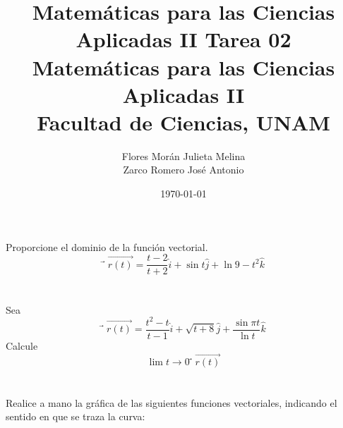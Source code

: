 \documentclass[12pt]{article}
\title{Matemáticas para las Ciencias Aplicadas II}
\title{
	\textbf{Tarea 02} \\
	\vspace{1ex}
	\large Matemáticas para las Ciencias Aplicadas II \\
	Facultad de Ciencias, UNAM}
\date{\today}
\author{Flores Morán Julieta Melina \\ Zarco Romero José Antonio}
\begin{document}
\maketitle

\section{}

Proporcione el dominio de la función vectorial.
$$
⃗\vec{r(t)}
=
\frac{t-2}{t+2}\hat{i}
+
\sin{t}\hat{j}
+
\ln{9-t^2}\hat{k}
$$

\section{}

Sea
$$
⃗\vec{r(t)}
=
\frac{t^2-t}{t-1}\hat{i}
+
\sqrt{t+8}\hat{j}
+
\frac{\sin{\pi t}}{\ln{t}}\hat{k}
$$
Calcule $$ \lim{t \to 0} ⃗\vec{r(t)} $$

\section{}

Realice a mano la gráfica de las siguientes funciones vectoriales, indicando el sentido en que se traza la curva:
\end{document}

